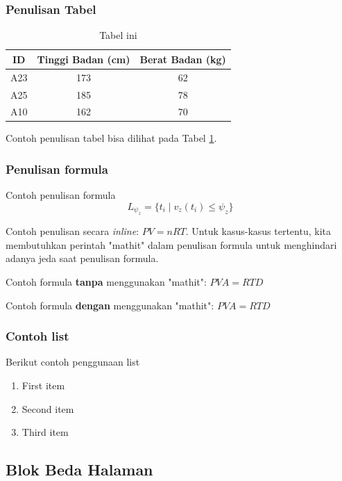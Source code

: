 \subsubsection{Penulisan Tabel}
\begin{table}[h]
	\caption{Tabel ini}
	\vspace{0.5em}
	\centering
	\begin{tabular}{|c|c|c|}
		\hline
		ID & Tinggi Badan (cm) & Berat Badan (kg) \\
		\hline \hline
		A23 & 173 & 62 \\
		A25 & 185 & 78 \\
		A10 & 162 & 70 \\ \hline
	\end{tabular}
	\label{Tab: Tabel Tinggi Berat}
\end{table}
Contoh penulisan tabel bisa dilihat pada Tabel \ref{Tab: Tabel Tinggi Berat}.

\subsubsection{Penulisan formula}
Contoh penulisan formula
\begin{equation}
	L_{\psi_z} = \{ t_i \mid v_z(t_i) \le \psi_z \}
\end{equation}

Contoh penulisan secara \textit{inline}: $\mathit{PV = nRT}$. Untuk kasus-kasus tertentu, kita membutuhkan perintah "mathit" dalam penulisan formula untuk menghindari adanya jeda saat penulisan formula.

Contoh formula \textbf{tanpa} menggunakan "mathit": $PVA = RTD$

Contoh formula \textbf{dengan} menggunakan "mathit": $\mathit{PVA = RTD}$



\subsubsection{Contoh list}
Berikut contoh penggunaan list
\begin{enumerate}
	\item First item
	\item Second item
	\item Third item
\end{enumerate}

\subsection{Blok Beda Halaman}

